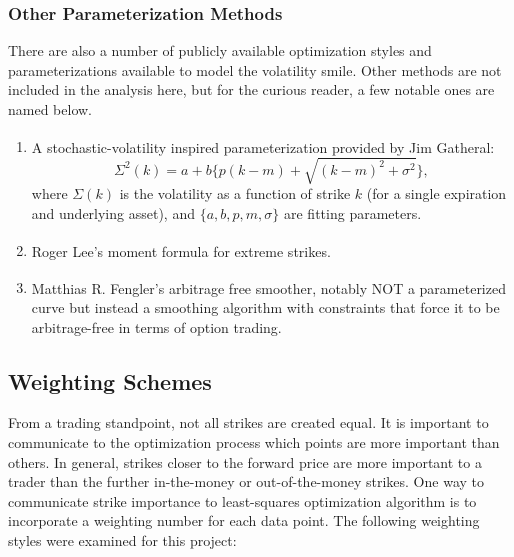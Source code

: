 \documentclass[12pt, a4paper, notitlepage]{article}
\numberwithin{equation}{subsection}
\numberwithin{figure}{subsection}
\numberwithin{table}{subsection}
\begin{document}
\subsubsection{Other Parameterization Methods}
There are also a number of publicly available optimization styles and parameterizations available to model the volatility smile.  Other methods are not included in the analysis here, but for the curious reader, a few notable ones are named below.
\begin{enumerate}
	\item A stochastic-volatility inspired parameterization provided by Jim Gatheral\textsuperscript{\cite{Gatheral}}:
\begin{equation}
\Sigma^{2}(k) = a + b\Big\{p(k-m) + \sqrt{(k-m)^{2}+ \sigma^{2}} \Big\},
\end{equation}
where $\Sigma(k)$ is the volatility as a function of strike $k$ (for a single expiration and underlying asset), and $\{a,b,p,m,\sigma\}$ are fitting parameters.
	\item Roger Lee's moment formula for extreme strikes\textsuperscript{\cite{Lee}}.
    \item Matthias R. Fengler's arbitrage free smoother\textsuperscript{\cite{Fengler}}, notably NOT a parameterized curve but instead a smoothing algorithm with constraints that force it to be arbitrage-free in terms of option trading.
\end{enumerate}

\subsection{Weighting Schemes}\label{sec:WeightingSchemes}
From a trading standpoint, not all strikes are created equal.  It is important to communicate to the optimization process which points are more important than others.  In general, strikes closer to the forward price are more important to a trader than the further in-the-money or out-of-the-money strikes.  One way to communicate strike importance to least-squares optimization algorithm is to incorporate a weighting number for each data point.  The following weighting styles were examined for this project:
\end{document}
